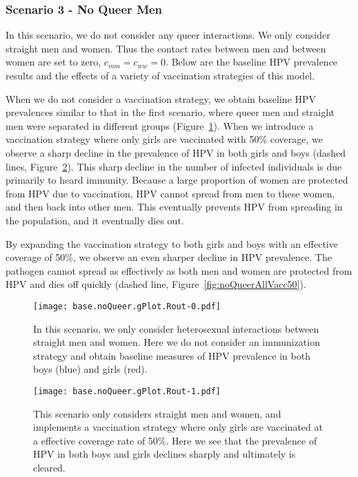 \documentclass[12pt]{article}
\begin{document}
\newpage
\subsubsection{Scenario 3 - No Queer Men}

In this scenario, we do not consider any queer interactions.  We only consider straight men and women.  Thus the contact rates between men and between women are set to zero, $c_{mm} = c_{ww} = 0$.  Below are the baseline HPV prevalence results and the effects of a variety of vaccination strategies of this model. 

When we do not consider a vaccination strategy, we obtain baseline HPV prevalences similar to that in the first scenario, where queer men and straight men were separated in different groups (Figure~\ref{fig:noQueerNoVacc}).  When we introduce a vaccination strategy where only girls are vaccinated with 50\% coverage, we observe a sharp decline in the prevalence of HPV in both girls and boys (dashed lines, Figure~\ref{fig:noQueerGirlVacc50}).  This sharp decline in the number of infected individuals is due primarily to heard immunity.  Because a large proportion of women are protected from HPV due to vaccination, HPV cannot spread from men to these women, and then back into other men.  This eventually prevents HPV from spreading in the population, and it eventually dies out. 

By expanding the vaccination strategy to both girls and boys with an effective coverage of 50\%, we observe an even sharper decline in HPV prevalence.  The pathogen cannot spread as effectively as both men and women are protected from HPV and dies off quickly (dashed line, Figure~\ref{fig:noQueerAllVacc50}).

\begin{figure}[h!]
\begin{center}
\texttt{[image: base.noQueer.gPlot.Rout-0.pdf]}
\caption{In this scenario, we only consider heterosexual interactions between straight men and women.  Here we do not consider an immunization strategy and obtain baseline measures of HPV prevalence in both boys (blue) and girls (red).}
\label{fig:noQueerNoVacc}
\end{center}
\end{figure}

\begin{figure}[h!]
\begin{center}
\texttt{[image: base.noQueer.gPlot.Rout-1.pdf]}
\caption{This scenario only considers straight men and women, and implements a vaccination strategy where only girls are vaccinated at a effective coverage rate of 50\%.  Here we see that the prevalence of HPV in both boys and girls declines sharply and ultimately is cleared.}
\label{fig:noQueerGirlVacc50}
\end{center}
\end{figure}
\end{document}
